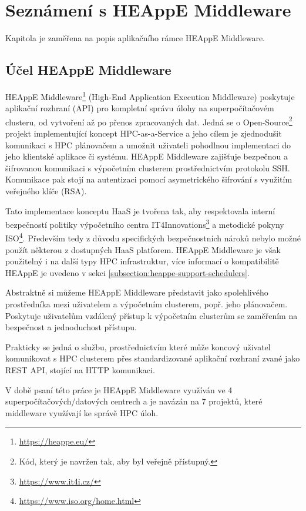 \chapter{Seznámení s HEAppE Middleware}\label{chapter:chapter-about-heappe-middleware}
Kapitola je zaměřena na popis aplikačního rámce HEAppE Middleware.

\section{Účel HEAppE Middleware}
HEAppE Middleware\footnote{\href{https://heappe.eu/}{https://heappe.eu/}} (High-End Application Execution Middleware) poskytuje aplikační rozhraní (API) pro kompletní správu úlohy na superpočítačovém clusteru, od vytvoření až po přenos zpracovaných dat. Jedná se o Open-Source\footnote{Kód, který je navržen tak, aby byl veřejně přístupný.} projekt implementující koncept HPC-as-a-Service a jeho cílem je zjednodušit komunikaci s HPC plánovačem a umožnit uživateli pohodlnou implementaci do jeho klientské aplikace či systému. HEAppE Middleware zajišťuje bezpečnou a šifrovanou komunikaci s výpočetním clusterem prostřednictvím protokolu SSH. Komunikace pak stojí na autentizaci pomocí asymetrického šifrování s využitím veřejného klíče (RSA).

Tato implementace konceptu HaaS je tvořena tak, aby respektovala interní bezpečností politiky výpočetního centra IT4Innovations\footnote{\href{https://www.it4i.cz/}{https://www.it4i.cz/}} a metodické pokyny ISO\footnote{\href{https://www.iso.org/home.html}{https://www.iso.org/home.html}}. Především tedy z důvodu specifických bezpečnostních nároků nebylo možné použít některou z dostupných HaaS platforem. HEAppE Middleware je však použitelný i na další typy HPC infrastruktur, více informací o kompatibilitě HEAppE je uvedeno v sekci \ref{subsection:heappe-support-schedulers}.


Abstraktně si můžeme HEAppE Middleware představit jako spolehlivého prostředníka mezi uživatelem a výpočetním clusterem, popř. jeho plánovačem. Poskytuje uživatelům vzdálený přístup k výpočetním clusterům se zaměřením na bezpečnost a jednoduchost přístupu.

Prakticky se jedná o službu, prostřednictvím které může koncový uživatel komunikovat s HPC clusterem přes standardizované aplikační rozhraní zvané jako REST API, stojící na HTTP komunikaci.

V době psaní této práce je HEAppE Middleware využíván ve 4 superpočítačových/datových centrech a je navázán na 7 projektů, které middleware využívají ke správě HPC úloh.


